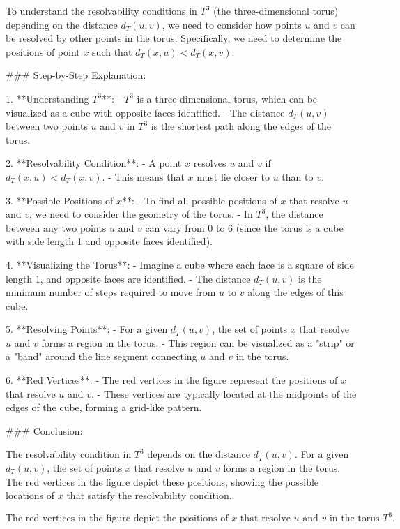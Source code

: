 To understand the resolvability conditions in \( T^3 \) (the three-dimensional torus) depending on the distance \( d_T(u, v) \), we need to consider how points \( u \) and \( v \) can be resolved by other points in the torus. Specifically, we need to determine the positions of point \( x \) such that \( d_T(x, u) < d_T(x, v) \).

### Step-by-Step Explanation:

1. **Understanding \( T^3 \)**:
   - \( T^3 \) is a three-dimensional torus, which can be visualized as a cube with opposite faces identified.
   - The distance \( d_T(u, v) \) between two points \( u \) and \( v \) in \( T^3 \) is the shortest path along the edges of the torus.

2. **Resolvability Condition**:
   - A point \( x \) resolves \( u \) and \( v \) if \( d_T(x, u) < d_T(x, v) \).
   - This means that \( x \) must lie closer to \( u \) than to \( v \).

3. **Possible Positions of \( x \)**:
   - To find all possible positions of \( x \) that resolve \( u \) and \( v \), we need to consider the geometry of the torus.
   - In \( T^3 \), the distance between any two points \( u \) and \( v \) can vary from 0 to 6 (since the torus is a cube with side length 1 and opposite faces identified).

4. **Visualizing the Torus**:
   - Imagine a cube where each face is a square of side length 1, and opposite faces are identified.
   - The distance \( d_T(u, v) \) is the minimum number of steps required to move from \( u \) to \( v \) along the edges of this cube.

5. **Resolving Points**:
   - For a given \( d_T(u, v) \), the set of points \( x \) that resolve \( u \) and \( v \) forms a region in the torus.
   - This region can be visualized as a "strip" or a "band" around the line segment connecting \( u \) and \( v \) in the torus.

6. **Red Vertices**:
   - The red vertices in the figure represent the positions of \( x \) that resolve \( u \) and \( v \).
   - These vertices are typically located at the midpoints of the edges of the cube, forming a grid-like pattern.

### Conclusion:

The resolvability condition in \( T^3 \) depends on the distance \( d_T(u, v) \). For a given \( d_T(u, v) \), the set of points \( x \) that resolve \( u \) and \( v \) forms a region in the torus. The red vertices in the figure depict these positions, showing the possible locations of \( x \) that satisfy the resolvability condition.

\[
\boxed{\text{The red vertices in the figure depict the positions of } x \text{ that resolve } u \text{ and } v \text{ in the torus } T^3.}
\]